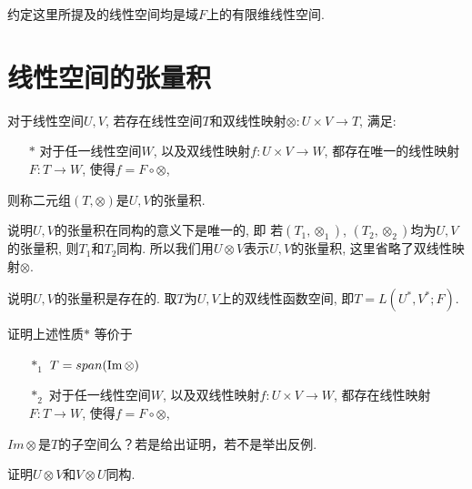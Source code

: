 约定这里所提及的线性空间均是域$F$上的有限维线性空间.
\section{线性空间的张量积}
\begin{definition}
    对于线性空间$U,V$, 若存在线性空间$T$和双线性映射$\otimes: U\times V \rightarrow T$,
    满足: 
    \begin{enumerate}
        \item[$*$] 对于任一线性空间$W$, 以及双线性映射$f: U\times V \rightarrow W$, 
    都存在唯一的线性映射$F: T\rightarrow W$, 使得$f = F \circ \otimes$,
    \end{enumerate}
    则称二元组$(T, \otimes)$是$U,V$的张量积.
\end{definition}

\begin{remark}
    说明$U, V$的张量积在同构的意义下是唯一的, 即
    若$(T_1, \otimes_1)$, $(T_2, \otimes_2)$均为$U,V$的张量积,
    则$T_1$和$T_2$同构.
    所以我们用$U\otimes V$表示$U,V$的张量积, 
    这里省略了双线性映射$\otimes$.
\end{remark}
\vspace{6cm}

\begin{remark}
说明$U,V$的张量积是存在的.
取$T$为$U,V$上的双线性函数空间, 即$T = L(U^*,V^*;F)$.
\end{remark}
\vspace{5cm}

\begin{remark}
    证明上述性质$*$ 等价于
    \begin{enumerate}
        \item [$*_1$] $T = span( \mathrm{Im}\, \otimes)$
        \item [$*_2$] 对于任一线性空间$W$, 以及双线性映射$f: U\times V \rightarrow W$, 
    都存在线性映射$F: T\rightarrow W$, 使得$f = F \circ \otimes$,
    \end{enumerate}
\end{remark}
\vspace{6cm}

\begin{remark}
    $Im \otimes$是$T$的子空间么？若是给出证明，若不是举出反例.
\end{remark}
\vspace{4cm}

\begin{remark}
    证明$U \otimes V$和$V \otimes U$同构.
\end{remark}
\vspace{5cm}


